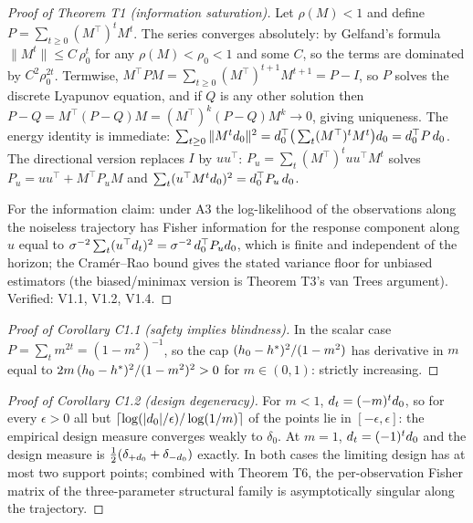 \documentclass[11pt]{article}
\begin{document}
\begin{proof}[Proof of Theorem T1 (information saturation)]
Let $\rho(M) < 1$ and define $P = \sum_{t\ge 0} (M^\top)^t M^t$. The series
converges absolutely: by Gelfand's formula $\|M^t\| \le C\,\rho_0^t$ for any
$\rho(M) < \rho_0 < 1$ and some $C$, so the terms are dominated by
$C^2\rho_0^{2t}$. Termwise,
$M^\top P M = \sum_{t \ge 0} (M^\top)^{t+1}M^{t+1} = P - I$, so $P$ solves
the discrete Lyapunov equation, and if $Q$ is any other solution then
$P - Q = M^\top (P-Q) M = (M^\top)^k (P-Q) M^k \to 0$, giving uniqueness.
The energy identity is immediate:
$\sum_{t\ge 0} \|M^t d_0\|^2 = d_0^\top \big(\sum_t (M^\top)^t M^t\big)
d_0 = d_0^\top P\,d_0$. The directional version replaces $I$ by
$uu^\top$: $P_u = \sum_t (M^\top)^t uu^\top M^t$ solves
$P_u = uu^\top + M^\top P_u M$ and
$\sum_t (u^\top M^t d_0)^2 = d_0^\top P_u\,d_0$.

For the information claim: under A3 the log-likelihood of the observations
along the noiseless trajectory has Fisher information for the response
component along $u$ equal to $\sigma^{-2}\sum_t (u^\top d_t)^2 =
\sigma^{-2}\,d_0^\top P_u d_0$, which is finite and independent of the
horizon; the Cram\'er--Rao bound gives the stated variance floor for
unbiased estimators (the biased/minimax version is Theorem T3's van Trees
argument). Verified: V1.1, V1.2, V1.4.
\end{proof}

\begin{proof}[Proof of Corollary C1.1 (safety implies blindness)]
In the scalar case $P = \sum_t m^{2t} = (1-m^2)^{-1}$, so the cap
$(h_0-h^{*})^2/(1-m^2)$ has derivative in $m$ equal to
$2m\,(h_0-h^{*})^2/(1-m^2)^2 > 0$ for $m \in (0,1)$: strictly increasing.
\end{proof}

\begin{proof}[Proof of Corollary C1.2 (design degeneracy)]
For $m < 1$, $d_t = (-m)^t d_0$, so for every $\epsilon > 0$ all but
$\lceil \log(|d_0|/\epsilon)/\log(1/m)\rceil$ of the points lie in
$[-\epsilon, \epsilon]$: the empirical design measure converges weakly to
$\delta_0$. At $m = 1$, $d_t = (-1)^t d_0$ and the design measure is
$\tfrac{1}{2}(\delta_{+d_0} + \delta_{-d_0})$ exactly. In both cases
the limiting design has at most two support points; combined with Theorem
T6, the per-observation Fisher matrix of the three-parameter structural
family is asymptotically singular along the trajectory.
\end{proof}
\end{document}
